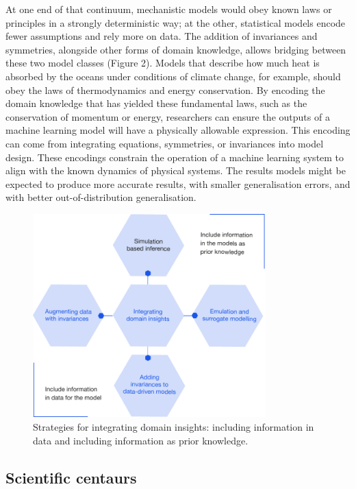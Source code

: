 At one end of that continuum, mechanistic models would obey known laws
or principles in a strongly deterministic way; at the other, statistical
models encode fewer assumptions and rely more on data. The addition of
invariances and symmetries, alongside other forms of domain knowledge,
allows bridging between these two model classes (Figure 2). Models that
describe how much heat is absorbed by the oceans under conditions of
climate change, for example, should obey the laws of thermodynamics and
energy conservation. By encoding the domain knowledge that has yielded
these fundamental laws, such as the conservation of momentum or energy,
researchers can ensure the outputs of a machine learning model will have
a physically allowable expression. This encoding can come from
integrating equations, symmetries, or invariances into model design.
These encodings constrain the operation of a machine learning system to
align with the known dynamics of physical systems. The results models
might be expected to produce more accurate results, with smaller
generalisation errors, and with better out-of-distribution
generalisation.

\begin{figure}
\begin{center}
\includegraphics[width=0.8\textwidth]{media/figure-2.pdf}
\end{center}
\caption{Strategies for integrating domain insights: including information in data and including information as prior knowledge.}
\end{figure}

\subsection{Scientific centaurs}\label{scientific-centaurs}

